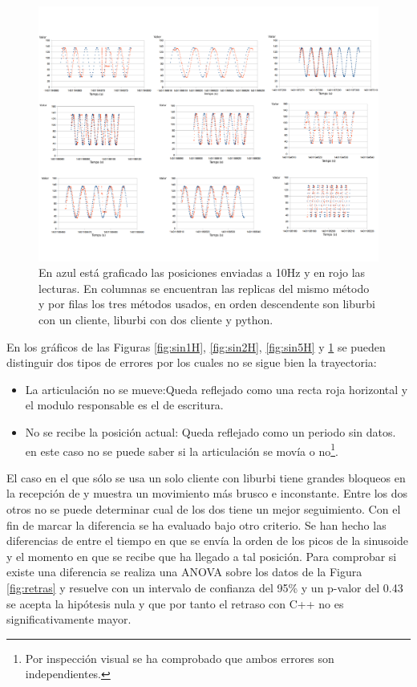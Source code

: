 \documentclass[12pt,a4paper,final,twoside]{book}
\begin{document}
\begin{figure}[H]
	\centering
    \includegraphics[scale=0.37]{images/sin10H.pdf}
	 \caption{En azul está graficado las posiciones enviadas a 10Hz y en rojo las lecturas. En columnas se encuentran las replicas del mismo método y por filas los tres métodos usados, en orden descendente son liburbi con un cliente, liburbi con dos cliente y python.}
  \label{fig:sin10H}
\end{figure}

En los gráficos de las Figuras \ref{fig:sin1H}, \ref{fig:sin2H}, \ref{fig:sin5H} y \ref{fig:sin10H} se pueden distinguir  dos tipos de errores por los cuales no se sigue bien la trayectoria:

\begin{itemize}
\item La articulación no se mueve:Queda reflejado como una recta roja horizontal y el modulo responsable es el de escritura.
\item No se recibe la posición actual: Queda reflejado como un periodo sin datos. en este caso no se puede saber si la articulación se movía o no\footnote{Por inspección visual se ha comprobado que ambos errores son independientes.}.
\end{itemize}
El caso en el que sólo se usa un solo cliente con liburbi tiene grandes bloqueos en la recepción de y muestra un movimiento más brusco e inconstante.
Entre los dos otros no se puede determinar cual de los dos tiene un mejor seguimiento. Con el fin de marcar la diferencia se ha evaluado bajo otro criterio.
Se han hecho las diferencias de entre el tiempo en que se envía la orden de los picos de la sinusoide y el momento en que se recibe que ha llegado a tal posición. Para comprobar si existe una diferencia se realiza una ANOVA sobre los datos de la Figura \ref{fig:retras} y resuelve con un intervalo de confianza del 95\% y un p-valor del 0.43  se acepta la hipótesis nula y que por tanto el retraso con C++ no es significativamente mayor. 
 
\end{document}
